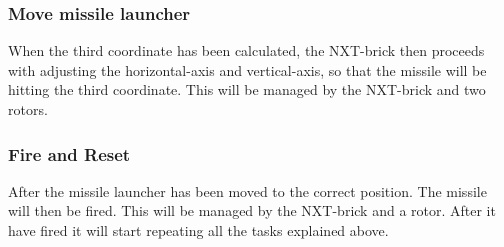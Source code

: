 \subsubsection{Move missile launcher}
	When the third coordinate has been calculated, the NXT-brick then proceeds with adjusting the horizontal-axis and vertical-axis, so that the missile will be hitting the third coordinate.
	This will be managed by the NXT-brick and two rotors.
	
\subsubsection{Fire and Reset}
	After the missile launcher has been moved to the correct position. The missile will then be fired. This will be managed by the NXT-brick and a rotor. After it have fired it will start repeating all the tasks explained above.